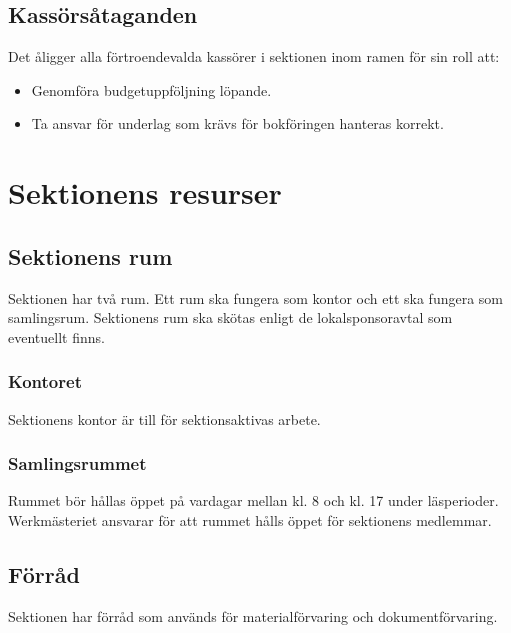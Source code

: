 \documentclass{datateknologsektionen-document}
\begin{document}
\subsection{Kassörsåtaganden}
\label{kassorsataganden}
Det åligger alla förtroendevalda kassörer i sektionen inom ramen för sin roll att:
\begin{itemize}
  \item Genomföra budgetuppföljning löpande.
  \item Ta ansvar för underlag som krävs för bokföringen hanteras korrekt.
\end{itemize}

\section{Sektionens resurser}
\subsection{Sektionens rum}
Sektionen har två rum. Ett rum ska fungera som kontor och ett ska fungera som samlingsrum.
Sektionens rum ska skötas enligt de lokalsponsoravtal som eventuellt finns.

\subsubsection{Kontoret}
Sektionens kontor är till för sektionsaktivas arbete.

\subsubsection{Samlingsrummet}
Rummet bör hållas öppet på vardagar mellan kl. 8 och kl. 17 under läsperioder.
Werkmästeriet ansvarar för att rummet hålls öppet för sektionens medlemmar.

\subsection{Förråd}
Sektionen har förråd som används för materialförvaring och dokumentförvaring.
\end{document}
